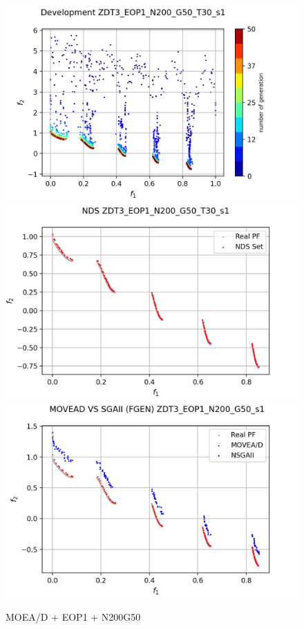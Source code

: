 \begin{minipage}[H]{0.47\linewidth}
    \begin{figure}[H]
        \centering
        \includegraphics[scale=0.55]{figures/ZDT3_EOP1_N200_G50_T30/s1_dev.png}\\
        \includegraphics[scale=0.5]{figures/ZDT3_EOP1_N200_G50_T30/s1_nds.png}\\
        \includegraphics[scale=0.5]{figures/ZDT3_EOP1_N200_G50_T30/s1_comp.png}\\
        \caption{MOEA/D + EOP1 + N200G50}
        \label{fig:4}
    \end{figure}

    \vfill
    \end{minipage}\\


